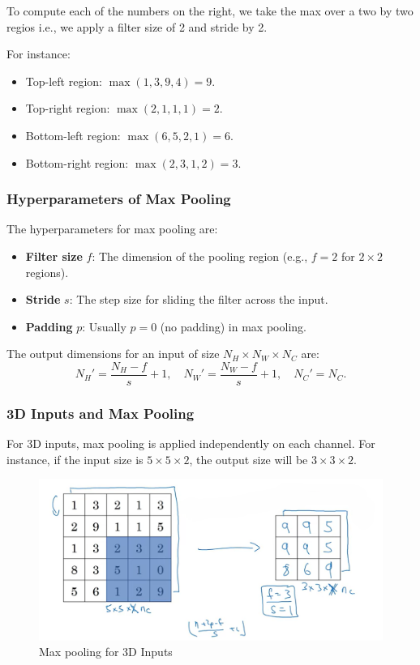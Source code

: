 \documentclass[letterpaper,12pt,notitlepage,twoside]{report}
\begin{document}
To compute each of the numbers on the right, we take the  max over a two by two regios i.e., we apply a filter size of 2 and stride by 2.

For instance:
\begin{itemize}[nosep]
    \item Top-left region: $\max(1, 3, 9, 4) = 9$.
    \item Top-right region: $\max(2, 1, 1, 1) = 2$.
    \item Bottom-left region: $\max(6, 5, 2, 1) = 6$.
    \item Bottom-right region: $\max(2, 3, 1, 2) = 3$.
\end{itemize}

\subsubsection*{Hyperparameters of Max Pooling}
The hyperparameters for max pooling are:
\begin{itemize}
    \item \textbf{Filter size} $f$: The dimension of the pooling region (e.g., $f = 2$ for $2 \times 2$ regions).
    \item \textbf{Stride} $s$: The step size for sliding the filter across the input.
    \item \textbf{Padding} $p$: Usually $p=0$ (no padding) in max pooling.
\end{itemize}

The output dimensions for an input of size $N_H \times N_W \times N_C$ are:
\[
N_H' = \frac{N_H - f}{s} + 1, \quad
N_W' = \frac{N_W - f}{s} + 1, \quad
N_C' = N_C.
\]

\subsubsection*{3D Inputs and Max Pooling}
For 3D inputs, max pooling is applied independently on each channel. For instance, if the input size is $5 \times 5 \times 2$, the output size will be $3 \times 3 \times 2$.

\begin{figure}[h]
	\centering
	\includegraphics[width=\textwidth]{Images/3D Max Pooling.png}
	\caption{Max pooling for 3D Inputs}
	\label{fig:29}
\end{figure}
\FloatBarrier
\end{document}
